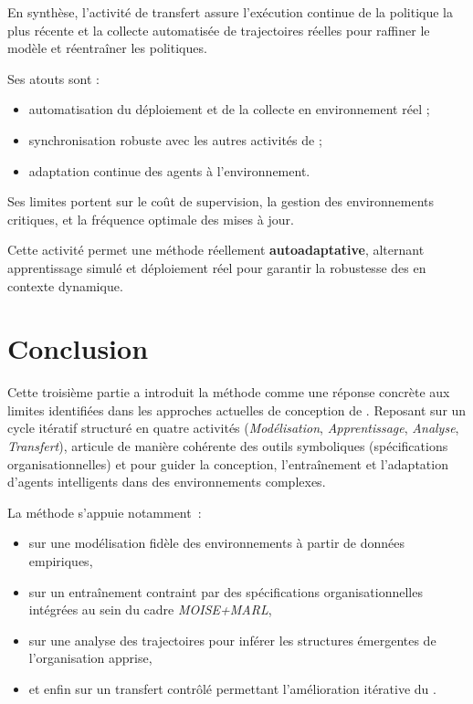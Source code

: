 En synthèse, l’activité de transfert assure l’exécution continue de la politique la plus récente et la collecte automatisée de trajectoires réelles pour raffiner le modèle et réentraîner les politiques.

Ses atouts sont :
\begin{itemize}
    \item automatisation du déploiement et de la collecte en environnement réel ;
    \item synchronisation robuste avec les autres activités de  ;
    \item adaptation continue des agents à l’environnement.
\end{itemize}

Ses limites portent sur le coût de supervision, la gestion des environnements critiques, et la fréquence optimale des mises à jour.

Cette activité permet une méthode réellement \textbf{autoadaptative}, alternant apprentissage simulé et déploiement réel pour garantir la robustesse des  en contexte dynamique.



\clearpage
\thispagestyle{empty}
\null
\newpage

\chapter*{Conclusion}

\noindent
Cette troisième partie a introduit la méthode \textbf{} comme une réponse concrète aux limites identifiées dans les approches actuelles de conception de . Reposant sur un cycle itératif structuré en quatre activités (\textit{Modélisation}, \textit{Apprentissage}, \textit{Analyse}, \textit{Transfert}),  articule de manière cohérente des outils symboliques (spécifications organisationnelles) et  pour guider la conception, l'entraînement et l'adaptation d'agents intelligents dans des environnements complexes.

\medskip

\noindent
La méthode s'appuie notamment~:
\begin{itemize}
    \item sur une modélisation fidèle des environnements à partir de données empiriques,
    \item sur un entraînement contraint par des spécifications organisationnelles intégrées au sein du cadre \textit{MOISE+MARL},
    \item sur une analyse des trajectoires pour inférer les structures émergentes de l'organisation apprise,
    \item et enfin sur un transfert contrôlé permettant l'amélioration itérative du .
\end{itemize}

